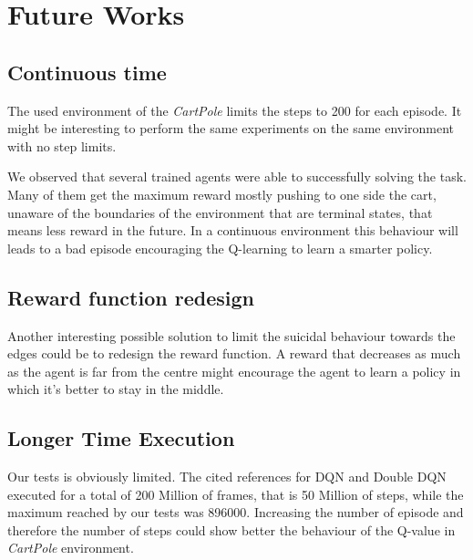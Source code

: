 
\section{Future Works}

\subsection{Continuous time}

The used environment of the \textit{CartPole} limits the steps to 200 for each episode. It might be interesting to perform the same experiments on the same environment with no step limits.

We observed that several trained agents were able to successfully solving the task. Many of them get the maximum reward mostly pushing to one side the cart, unaware of the boundaries of the environment that are terminal states, that means less reward in the future. In a continuous environment this behaviour will leads to a bad episode encouraging the Q-learning to learn a smarter policy.

\subsection{Reward function redesign}

Another interesting possible solution to limit the suicidal behaviour towards the edges could be to redesign the reward function. A reward that decreases as much as the agent is far from the centre might encourage the agent to learn a policy in which it's better to stay in the middle.

\subsection{Longer Time Execution}

Our tests is obviously limited. The cited references for DQN and Double DQN executed for a total of 200 Million of frames, that is 50 Million of steps, while the maximum reached by our tests was 896000. Increasing the number of episode and therefore the number of steps could show better the behaviour of the Q-value in \textit{CartPole} environment.